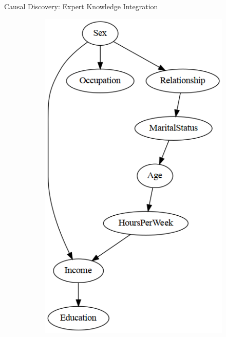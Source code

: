 \documentclass[aspectratio=169]{beamer}
\begin{document}
\begin{frame}{Causal Discovery: Expert Knowledge Integration}
\begin{figure}
\begin{subfigure}{0.45 \textwidth}
			\includegraphics[scale=0.28]{imgs/adult_bic_start.png}
		\end{subfigure}
	\end{figure}
\end{frame}
\end{document}
